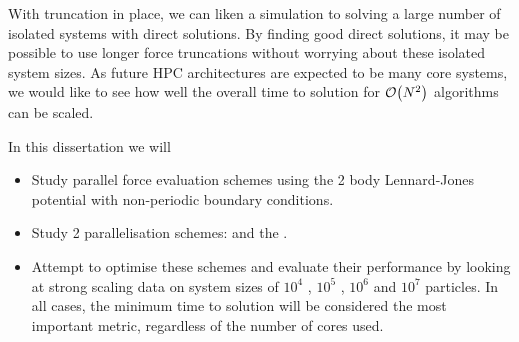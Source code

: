 %
With truncation in place, we can liken a simulation to solving a
large number of isolated systems with direct solutions.
%
By finding good direct solutions, it may be possible to use longer force
truncations without worrying about these isolated system sizes.
%
As future HPC architectures are expected to be many core systems,
we would like to see how well the overall time to solution for
$\mathcal{O}{\left({ N^2 }\right)}$ algorithms can be scaled.


%
In this dissertation we will
\begin{itemize}
\item
    Study parallel force evaluation schemes using
    the 2 body Lennard-Jones potential with
    non-periodic boundary conditions.

\item
    Study 2 parallelisation schemes:
    \replicateddata{} and the \systolicloop{}.

\item
    Attempt to optimise these schemes and
    evaluate their performance by looking at
    strong scaling data on system sizes of
    $10^4$ , $10^5$ , $10^6$ and $10^7$ particles.
    In all cases, the minimum time to solution will be
    considered the most important metric,
    regardless of the number of cores used.
\end  {itemize}
